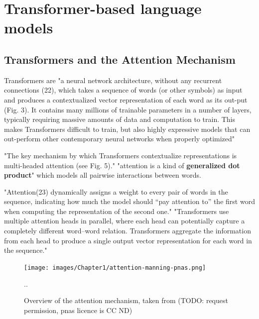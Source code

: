\pagebreak

\section{Transformer-based language models}


\subsection{Transformers and the Attention Mechanism}

Transformers  are "a neural network architecture,  without  any  recurrent  connections  (22),  which  takes  a sequence  of  words  (or  other  symbols)  as  input  and  produces a contextualized vector representation of each word as its out-put (Fig. 3). It contains many millions of trainable parameters in  a  number  of  layers,  typically  requiring  massive  amounts  of data  and  computation  to  train.  This  makes  Transformers  difficult  to  train,  but  also  highly  expressive  models  that  can  out-perform  other  contemporary  neural  networks  when  properly optimized" \citep{manning2020emergent}

"The key mechanism by which Transformers contextualize representations  is  multi-headed  attention  (see  Fig.  5)."  \citep{manning2020emergent} 
"attention is a kind of \textbf{generalized dot product}" %
which models all pairwise interactions between words.

"Attention(23) dynamically assigns a weight to every pair of words in the sequence, indicating how much the model should “pay attention to” the first word when computing the representation of the second one."  \citep{manning2020emergent}
"Transformers use multiple attention heads in parallel, where  each  head  can  potentially  capture  a  completely  different word–word relation. Transformers aggregate the information from each head to produce a single output vector representation for each word in the sequence." \citep{manning2020emergent}

\begin{figure}[H]
	\centering
	\texttt{[image: images/Chapter1/attention-manning-pnas.png]} 
	\caption{Overview of the attention mechanism, taken from \citet{manning2020emergent} (TODO: request permission, pnas licence is CC ND)} 
	\label{fig:manning_attention} 
	\medskip
	\small
	..
\end{figure}

